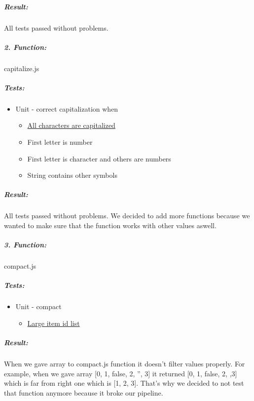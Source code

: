 \documentclass[a4paper, 12pt]{article}
\begin{document}
		\hypertarget{header-n25}{%
		\subparagraph{Result:}\label{header-n25}}
		
		All tests passed without problems.
		
		\hypertarget{header-n50}{%
		\subparagraph{2. Function:}\label{header-n50}}
		
		capitalize.js
		
		\hypertarget{header-n52}{%
		\subparagraph{Tests:}\label{header-n52}}
		
		\begin{itemize}
		\item
		Unit - correct capitalization when
		
		\begin{itemize}
			\item
			\underline{All characters are capitalized}
			\item
			First letter is number
			\item
			First letter is character and others are numbers
			\item
			String contains other symbols
		\end{itemize}
		\end{itemize}
		
		\hypertarget{header-n70}{%
		\subparagraph{\texorpdfstring{Result: }{Result: }}\label{header-n70}}
		
		All tests passed without problems. We decided to add more functions
		because we wanted to make sure that the function works with other values
		aswell.
		
\newpage
		
		\hypertarget{header-n378}{%
		\subparagraph{3. Function:}\label{header-n378}}
		
		compact.js
		
		\hypertarget{header-n380}{%
		\subparagraph{Tests:}\label{header-n380}}
		
		\begin{itemize}
		\item
		Unit - compact
		
		\begin{itemize}
			\item
			\underline{Large item id list}
		\end{itemize}
		\end{itemize}
		
		\hypertarget{header-n393}{%
		\subparagraph{\texorpdfstring{Result: }{Result: }}\label{header-n393}}
		
		When we gave array to compact.js function it doesn't filter values
		properly. For example, when we gave array {[}0, 1, false, 2, '', 3{]} it
		returned {[}0, 1, false, 2, ,3{]} which is far from right one which is
		{[}1, 2, 3{]}. That's why we decided to not test that function anymore
		because it broke our pipeline.
		
\end{document}
